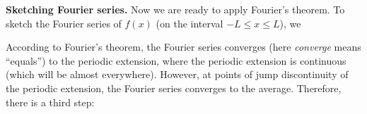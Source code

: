 \textbf{Sketching Fourier series.}  Now we are ready to apply Fourier's theorem.  To sketch the Fourier series of $f(x)$ (on the interval $-L \le x \le L$), we

\begin{center}
\end{center}

According to Fourier's theorem, the Fourier series converges (here \textit{converge} means ``equals'') to the periodic extension, where the periodic extension is continuous (which will be almost everywhere).  However, at points of jump discontinuity of the periodic extension, the Fourier series converges to the average.  Therefore, there is a third step:

\begin{center}
\end{center}

